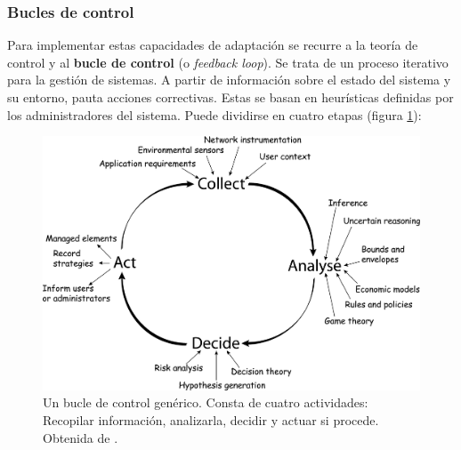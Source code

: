 \subsubsection{Bucles de control}

Para implementar estas capacidades de adaptación se recurre a la teoría de control y al \textbf{bucle de control} (o \emph{feedback loop}). \cite{brunEngineeringSelfAdaptiveSystems2009} Se trata de un proceso iterativo para la gestión de sistemas. A partir de información sobre el estado del sistema y su entorno, pauta acciones correctivas. Estas se basan en heurísticas definidas por los administradores del sistema. Puede dividirse en cuatro etapas (figura \ref{fig:bucle-control}):

\begin{figure}[h]
  \centering
  \includegraphics[scale=0.065]{cap_introduccion/images/feedback-loop}
  \caption[Un bucle de control genérico. Consta de cuatro actividades: Recopilar información, analizarla, decidir y actuar si procede.]{Un bucle de control genérico. Consta de cuatro actividades: Recopilar información, analizarla, decidir y actuar si procede. Obtenida de \cite{dobsonSurveyAutonomicCommunications2006}.}
  \label{fig:bucle-control}
\end{figure}

